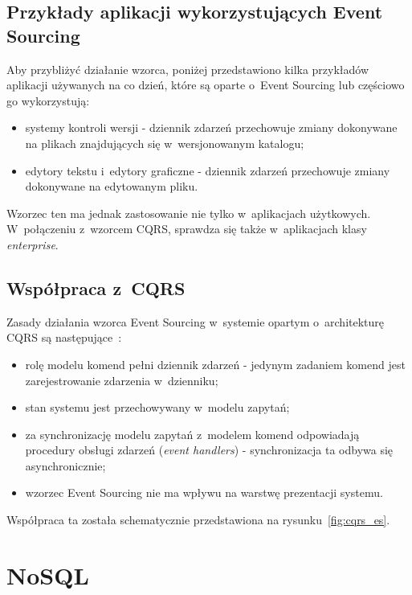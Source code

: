 \subsection{Przykłady aplikacji wykorzystujących Event Sourcing}

Aby przybliżyć działanie wzorca, poniżej przedstawiono kilka przykładów aplikacji używanych na co dzień, które są oparte o~Event Sourcing lub częściowo go wykorzystują:

\begin{itemize}
 \item systemy kontroli wersji - dziennik zdarzeń przechowuje zmiany dokonywane na plikach znajdujących się w~wersjonowanym katalogu;
 \item edytory tekstu i~edytory graficzne - dziennik zdarzeń przechowuje zmiany dokonywane na edytowanym pliku.
\end{itemize}

Wzorzec ten ma jednak zastosowanie nie tylko w~aplikacjach użytkowych.
W~połączeniu z~wzorcem CQRS, sprawdza się także w~aplikacjach klasy \emph{enterprise}.


\subsection{Współpraca z~CQRS}

Zasady działania wzorca Event Sourcing w~systemie opartym o~architekturę CQRS są następujące~\cite{cqrs_es}:

\begin{itemize}
 \item rolę modelu komend pełni dziennik zdarzeń - jedynym zadaniem komend jest zarejestrowanie zdarzenia w~dzienniku;
 \item stan systemu jest przechowywany w~modelu zapytań;
 \item za synchronizację modelu zapytań z~modelem komend odpowiadają procedury obsługi zdarzeń (\emph{event handlers}) - synchronizacja ta odbywa się asynchronicznie;
 \item wzorzec Event Sourcing nie ma wpływu na warstwę prezentacji systemu.
\end{itemize}


Współpraca ta została schematycznie przedstawiona na rysunku~\ref{fig:cqrs_es}.





\section{NoSQL}

